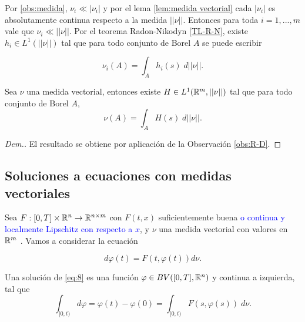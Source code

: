 \begin{obs}

Por \eqref{obs:medida}, $\nu_i\ll |\nu_i|$ y por el lema \ref{lem:medida vectorial} cada $|\nu_i|$ es absolutamente continua respecto a la medida $||\nu||$. Entonces para toda $i=1,..., m$ vale que $\nu_i\ll ||\nu||$.\label{obs:R-D}	Por el teorema Radon-Nikodyn \eqref{TL-R-N}, existe $h_i\in L^1(||\nu||) $ tal que para todo conjunto de Borel $A$ se puede escribir

	$$\nu_i(A)=\int_A h_i(s)\;d||\nu||.$$
 \end{obs}
 \begin{prop}\label{prop:medida vectorial}
Sea  $\nu$ una medida vectorial, entonces  existe $ H\in L^1(\mathbb{R}^m,||\nu||)$ tal que para todo conjunto de Borel $A$, 
    \begin{equation*}
		\nu(A)=\int_A H(s)\;d||\nu||.
	\end{equation*}
 \end{prop}

 
\begin{proof}[Dem.]
    El resultado se obtiene por aplicación de la Observación \eqref{obs:R-D}.
\end{proof}     

	
\subsection{Soluciones a ecuaciones con medidas vectoriales}

Sea $F:[0,T]\times\mathbb{R}^n\to \mathbb{R}^{n\times m}$ con $F(t,x)$  suficientemente buena \textcolor{blue}{ o continua y  localmente Lipschitz con respecto a $x$}, y $\nu$ una medida vectorial con valores en   $\mathbb{R}^m$ .
Vamos a considerar la ecuación 

\begin{equation}\label{eq:8}
d\varphi(t)=F(t,\varphi(t))d\nu . 
\end{equation}
\begin{defi}\label{def-sol}
	Una solución de \eqref{eq:8} es una función $\varphi\in BV([0,T],\mathbb{R}^n)$ y continua a izquierda, tal que  
\begin{equation}\label{eq:9}
    \int_{[0,t)}d\varphi=\varphi(t)-\varphi(0)=\int_{[0,t)}F(s,\varphi(s))\; d\nu.
\end{equation}
\end{defi}

